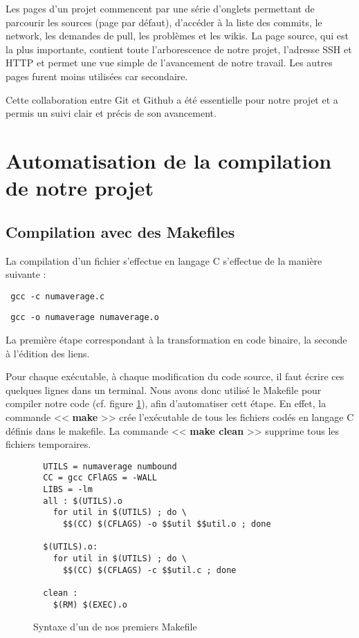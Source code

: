 Les pages d'un projet commencent par une s\'erie d'onglets permettant de parcourir les sources (page par d\'efaut), d'acc\'eder \`a la liste des
 commits, le network, les demandes de pull, les probl\`emes et les wikis.
La page source, qui est la plus importante, contient toute l'arborescence de notre projet, l'adresse SSH et HTTP et permet une vue simple
 de l'avancement de notre travail.
Les autres pages furent moins utilis\'ees car secondaire. 

Cette collaboration entre Git et Github a \'et\'e essentielle pour notre projet et a permis un suivi clair et pr\'ecis de son avancement.

\section{Automatisation de la compilation de notre projet}
\subsection{Compilation avec des Makefiles}

La compilation d'un fichier s'effectue en langage C s'effectue de la mani\`ere suivante :
\begin{verbatim} gcc -c numaverage.c\end{verbatim}
\begin{verbatim} gcc -o numaverage numaverage.o\end{verbatim}

La premi\`ere \'etape correspondant \`a la transformation en code binaire, la seconde \`a l'\'edition des liens.

Pour chaque ex\'ecutable, \`a chaque modification du code source, il faut \'ecrire ces quelques lignes dans un terminal.
Nous avons donc utilis\'e le Makefile pour compiler notre code (cf. figure \ref{fig:exemple_makefile}), afin d'automatiser cett \'etape.
En effet, la commande << \textbf{make} >> cr\'ee l'ex\'ecutable de tous les fichiers cod\'es en langage C d\'efinis dans le makefile. La commande
<< \textbf{make clean} >> supprime tous les fichiers temporaires.
\newline
\begin{figure}[h] 
\begin{center}

\begin{minipage}[|c|]{0.7\linewidth}
\begin{verbatim}
  UTILS = numaverage numbound
  CC = gcc CFlAGS = -WALL
  LIBS = -lm
  all : $(UTILS).o
    for util in $(UTILS) ; do \
      $$(CC) $(CFLAGS) -o $$util $$util.o ; done

  $(UTILS).o:
    for util in $(UTILS) ; do \
      $$(CC) $(CFLAGS) -c $$util.c ; done

  clean :
    $(RM) $(EXEC).o
\end{verbatim}
\end{minipage}
\end{center}
\caption{Syntaxe d'un de nos premiers Makefile}
\label{fig:exemple_makefile}
\end{figure}

